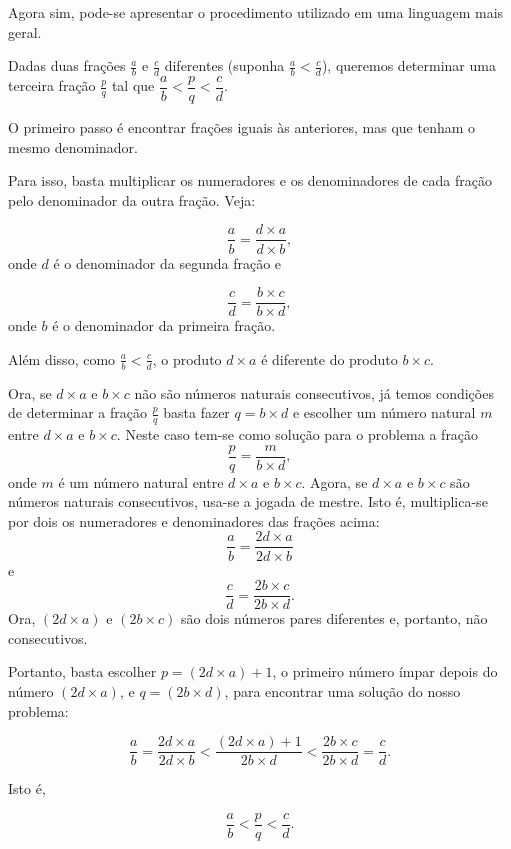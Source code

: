 \begin{refletindo*}[breakable]{}{}
  Agora sim, pode-se apresentar o procedimento utilizado em uma linguagem mais geral.

  Dadas duas frações   $\frac{a}{b}$ e   $\frac{c}{d}$ diferentes (suponha   $\frac{a}{b}<\frac{c}{d}$), queremos determinar uma terceira fração   $\frac{p}{q}$ tal que   $\dfrac{a}{b}<\dfrac{p}{q}<\dfrac{c}{d}$.

  O primeiro passo é encontrar frações iguais às anteriores, mas que tenham o mesmo denominador.

  Para isso, basta multiplicar os numeradores e os denominadores de cada fração pelo denominador da outra fração. Veja:

  $$\dfrac{a}{b} = \dfrac{d \times a}{d \times b},$$
  onde   $d$ é o denominador da segunda fração e

  $$\dfrac{c}{d} = \dfrac{b \times c}{b \times d},$$
  onde   $b$ é o denominador da primeira fração.

  Além disso, como   $\frac{a}{b}<\frac{c}{d}$, o produto   $d \times a$ é diferente do produto   $b \times c$.

  Ora, se   $d \times a$ e   $b \times c$ não são números naturais consecutivos, já temos condições de determinar a fração   $\frac{p}{q}$ basta fazer   $q = b \times d$ e escolher um número natural   $m$ entre   $d \times a$ e   $b \times c$. Neste caso tem-se como solução para o problema a fração
  $$\dfrac{p}{q} = \dfrac{m}{b \times d},$$
  onde   $m$ é um número natural entre   $d \times a$ e   $b \times c$.
  Agora, se   $d \times a$ e   $b \times c$ são números naturais consecutivos, usa-se a jogada de mestre. Isto é, multiplica-se por dois os numeradores e denominadores das frações acima:
  $$\dfrac{a}{b} = \dfrac{2d \times a}{2d \times b}$$
  e
  $$\dfrac{c}{d} = \dfrac{2b \times c}{2b \times d}.$$
  Ora,   $(2d \times a)$ e $(2b \times c)$ são dois números pares diferentes e, portanto, não consecutivos.

  Portanto, basta escolher   $p = (2d \times a) + 1$, o primeiro número ímpar depois do número    $(2d \times a)$,  e   $q=(2b \times d)$, para encontrar uma solução do nosso problema:

  $$\dfrac{a}{b} = \dfrac{2d \times a}{2d \times b} < \dfrac{(2d \times a) + 1}{2b \times d} <  \dfrac{2b \times c}{2b \times d} = \dfrac{c}{d}.$$

  Isto é,

  $$\dfrac{a}{b} < \dfrac{p}{q} < \dfrac{c}{d}.$$

\end{refletindo*}
